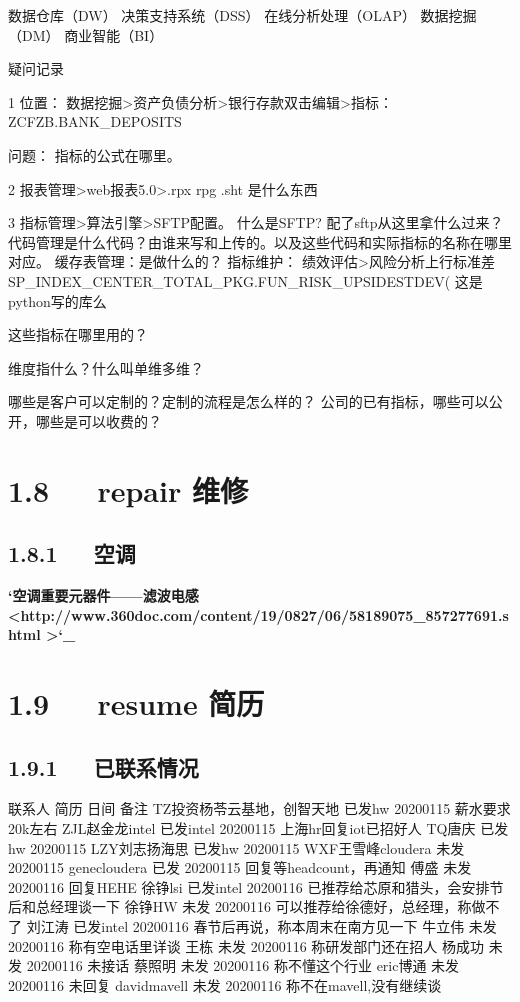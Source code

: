 \documentclass[letterpaper,12pt,english]{sphinxmanual}
\begin{document}
数据仓库（DW）
决策支持系统（DSS）
在线分析处理（OLAP）
数据挖掘（DM）
商业智能（BI）

疑问记录

1
位置：
数据挖掘\sphinxhyphen{}>资产负债分析\sphinxhyphen{}>银行存款\sphinxhyphen{}双击编辑>指标：ZCFZB.BANK\_DEPOSITS

问题：
指标的公式在哪里。

2
报表管理\sphinxhyphen{}>web报表5.0\sphinxhyphen{}>.rpx rpg .sht 是什么东西

3
指标管理\sphinxhyphen{}>算法引擎\sphinxhyphen{}>SFTP配置。 什么是SFTP? 配了sftp从这里拿什么过来？
代码管理是什么代码？由谁来写和上传的。以及这些代码和实际指标的名称在哪里对应。
缓存表管理：是做什么的？
指标维护：
绩效评估\sphinxhyphen{}>风险分析\sphinxhyphen{}上行标准差
SP\_INDEX\_CENTER\_TOTAL\_PKG.FUN\_RISK\_UPSIDESTDEV( 这是python写的库么

这些指标在哪里用的？

维度指什么？什么叫单维多维？

哪些是客户可以定制的？定制的流程是怎么样的？
公司的已有指标，哪些可以公开，哪些是可以收费的？


\section{1.8   repair 维修}
\label{\detokenize{000misc/memo:repair}}

\subsection{1.8.1   空调}
\label{\detokenize{000misc/memo:id17}}
{\color{red}\bfseries{}`空调重要元器件——滤波电感 <http://www.360doc.com/content/19/0827/06/58189075\_857277691.shtml
>`\_}


\section{1.9   resume 简历}
\label{\detokenize{000misc/memo:resume}}

\subsection{1.9.1   已联系情况}
\label{\detokenize{000misc/memo:id18}}
联系人  简历  日间  备注
TZ投资\sphinxhyphen{}杨苓\sphinxhyphen{}云基地，创智天地  已发hw  20200115  薪水要求20k左右
ZJL赵金龙\sphinxhyphen{}intel  已发intel  20200115  上海hr回复iot已招好人
TQ唐庆  已发hw  20200115
LZY刘志扬\sphinxhyphen{}海思  已发hw  20200115
WXF王雪峰\sphinxhyphen{}cloudera  未发  20200115
gene\sphinxhyphen{}cloudera  已发  20200115  回复等headcount，再通知
傅盛  未发  20200116  回复HEHE
徐铮lsi  已发intel  20200116  已推荐给芯原和猎头，会安排节后和总经理谈一下
徐铮HW  未发  20200116  可以推荐给徐德好，总经理，称做不了
刘江涛  已发intel  20200116  春节后再说，称本周末在南方见一下
牛立伟  未发  20200116  称有空电话里详谈
王栋    未发  20200116  称研发部门还在招人
杨成功  未发  20200116  未接话
蔡照明  未发  20200116  称不懂这个行业
eric博通  未发  20200116  未回复
david\sphinxhyphen{}mavell  未发  20200116  称不在mavell,没有继续谈
\end{document}
